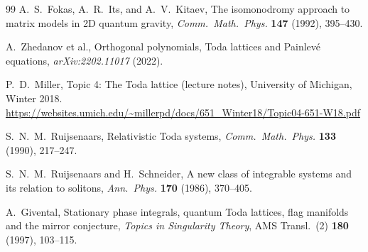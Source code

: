 \documentclass[12pt,a4paper]{article}
\theoremstyle{definition}
\begin{document}
\begin{thebibliography}{99}
A.~S.~Fokas, A.~R.~Its, and A.~V.~Kitaev,
\newblock The isomonodromy approach to matrix models in 2D quantum gravity,
\newblock \emph{Comm.\ Math.\ Phys.} \textbf{147} (1992), 395--430.

A.~Zhedanov et al.,
\newblock Orthogonal polynomials, Toda lattices and Painlev\'e equations,
\newblock \emph{arXiv:2202.11017} (2022).

P.~D.~Miller,
\newblock Topic 4: The Toda lattice (lecture notes),
\newblock University of Michigan, Winter 2018.
\newblock \url{https://websites.umich.edu/~millerpd/docs/651_Winter18/Topic04-651-W18.pdf}

S.~N.~M.~Ruijsenaars,
\newblock Relativistic Toda systems,
\newblock \emph{Comm.\ Math.\ Phys.} \textbf{133} (1990), 217--247.

S.~N.~M.~Ruijsenaars and H.~Schneider,
\newblock A new class of integrable systems and its relation to solitons,
\newblock \emph{Ann.\ Phys.} \textbf{170} (1986), 370--405.

A.~Givental,
\newblock Stationary phase integrals, quantum Toda lattices, flag manifolds
  and the mirror conjecture,
\newblock \emph{Topics in Singularity Theory}, AMS Transl.\ (2) \textbf{180}
  (1997), 103--115.

\end{thebibliography}
\end{document}
